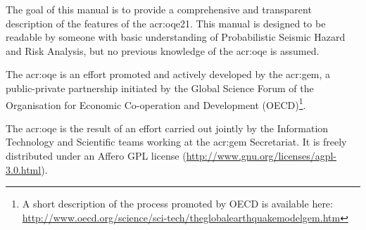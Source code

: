 The goal of this manual is to provide a comprehensive and transparent
description of the features of the \glsdesc{acr:oqe21}. This manual is
designed to be readable by someone with basic understanding of Probabilistic
Seismic Hazard and Risk Analysis, but no previous knowledge of the
\glsdesc{acr:oqe} is assumed.

The \glsdesc{acr:oqe} is an effort promoted and actively developed by the
\glsdesc{acr:gem}, a public-private partnership initiated by the
Global Science Forum of the Organisation for Economic Co-operation and Development
(OECD)\footnote{A short description of the process promoted by OECD is available here:\\\href{http://www.oecd.org/science/sci-tech/theglobalearthquakemodelgem.htm}{http://www.oecd.org/science/sci-tech/theglobalearthquakemodelgem.htm}}.

The \glsdesc{acr:oqe} is the result of an effort carried out jointly by the
Information Technology and Scientific teams working at the \gls{acr:gem} Secretariat.
It is freely distributed under an Affero GPL license
(\href{http://www.gnu.org/licenses/agpl-3.0.html}{http://www.gnu.org/licenses/agpl-3.0.html}).